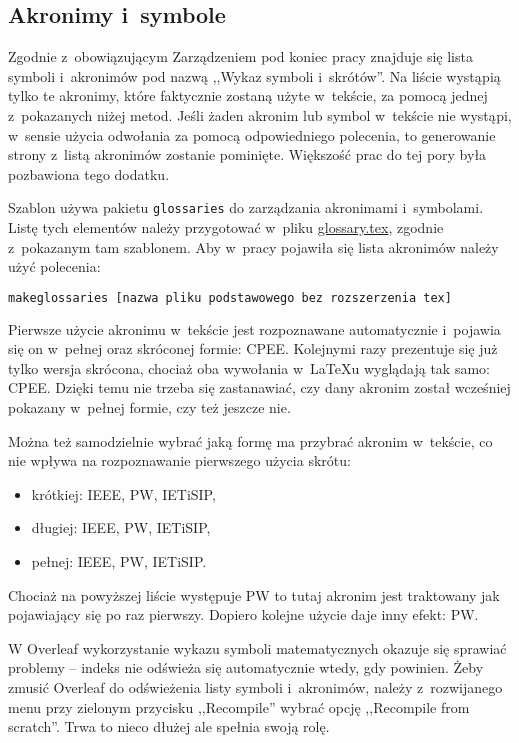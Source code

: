 \subsection{Akronimy i~symbole}
Zgodnie z~obowiązującym Zarządzeniem pod koniec pracy znajduje się lista symboli i~akronimów pod nazwą ,,Wykaz symboli i~skrótów''. Na liście wystąpią tylko te akronimy, które faktycznie zostaną użyte w~tekście, za pomocą jednej z~pokazanych niżej metod. Jeśli żaden akronim lub symbol w~tekście nie wystąpi, w~sensie użycia odwołania za pomocą odpowiedniego polecenia, to generowanie strony z~listą akronimów zostanie pominięte. Większość prac do tej pory była pozbawiona tego dodatku.

Szablon używa pakietu \texttt{glossaries} do zarządzania akronimami i~symbolami. Listę tych elementów należy przygotować w~pliku \href{./glossary.tex}{glossary.tex}, zgodnie z~pokazanym tam szablonem. Aby w~pracy pojawiła się lista akronimów należy użyć polecenia:

\begin{lstlisting}[language=bash,
    numbers=none,
    caption=Wygenerowanie listy skrótów i~symboli,
    label={lst:gloss}]
makeglossaries [nazwa pliku podstawowego bez rozszerzenia tex]
\end{lstlisting}

Pierwsze użycie akronimu w~tekście jest rozpoznawane automatycznie i~pojawia się on w~pełnej oraz skróconej formie: \gls{CPEE}. Kolejnymi razy prezentuje się już tylko wersja skrócona, chociaż oba wywołania w~\LaTeX{u} wyglądają tak samo: \gls{CPEE}. Dzięki temu nie trzeba się zastanawiać, czy dany akronim został wcześniej pokazany w~pełnej formie, czy też jeszcze nie.

Można też samodzielnie wybrać jaką formę ma przybrać akronim w~tekście, co nie wpływa na rozpoznawanie pierwszego użycia skrótu:
\begin{itemize}
    \item krótkiej: \acrshort{IEEE}, \acrshort{PW}, \acrshort{IETiSIP},
    \item długiej: \acrlong{IEEE}, \acrlong{PW}, \acrlong{IETiSIP},
    \item pełnej: \acrfull{IEEE}, \acrfull{PW}, \acrfull{IETiSIP}.
\end{itemize}

Chociaż na powyższej liście występuje \gls{PW} to tutaj akronim jest traktowany jak pojawiający się po raz pierwszy. Dopiero kolejne użycie daje inny efekt: \gls{PW}.

W Overleaf wykorzystanie wykazu symboli matematycznych okazuje się sprawiać problemy -- indeks nie odświeża się automatycznie wtedy, gdy powinien. Żeby zmusić Overleaf do odświeżenia listy symboli i~akronimów, należy z~rozwijanego menu przy zielonym przycisku ,,Recompile'' wybrać opcję ,,Recompile from scratch''. Trwa to nieco dłużej ale spełnia swoją rolę.

